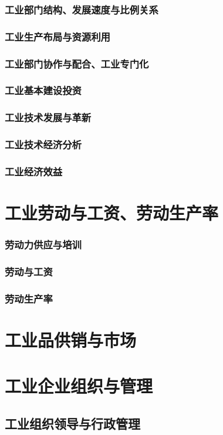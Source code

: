 \documentclass[UTF8]{../../RepresentationUniverse}
\begin{document}
    \subsubsection{工业部门结构、发展速度与比例关系}
    \subsubsection{工业生产布局与资源利用}
    \subsubsection{工业部门协作与配合、工业专门化}
    \subsubsection{工业基本建设投资}
    \subsubsection{工业技术发展与革新}
    \subsubsection{工业技术经济分析}
    \subsubsection{工业经济效益}
\section{工业劳动与工资、劳动生产率}
    \subsubsection{劳动力供应与培训}
    \subsubsection{劳动与工资}
    \subsubsection{劳动生产率}
\section{工业品供销与市场}
\section{工业企业组织与管理}
    \subsection{工业组织领导与行政管理}
\end{document}
